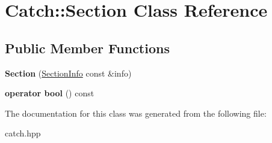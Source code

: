\hypertarget{classCatch_1_1Section}{
\section{Catch::Section Class Reference}
\label{classCatch_1_1Section}
}
\subsection*{Public Member Functions}
\begin{DoxyCompactItemize}
\item 
\hypertarget{classCatch_1_1Section_a68fd4e51e8981aaa7ddb00d8a6abd099}{
{\bfseries Section} (\hyperlink{structCatch_1_1SectionInfo}{SectionInfo} const \&info)}
\label{classCatch_1_1Section_a68fd4e51e8981aaa7ddb00d8a6abd099}

\item 
\hypertarget{classCatch_1_1Section_a6c9be48e8ba0611c4aa601102e706f3b}{
{\bfseries operator bool} () const }
\label{classCatch_1_1Section_a6c9be48e8ba0611c4aa601102e706f3b}

\end{DoxyCompactItemize}


The documentation for this class was generated from the following file:\begin{DoxyCompactItemize}
\item 
catch.hpp\end{DoxyCompactItemize}
